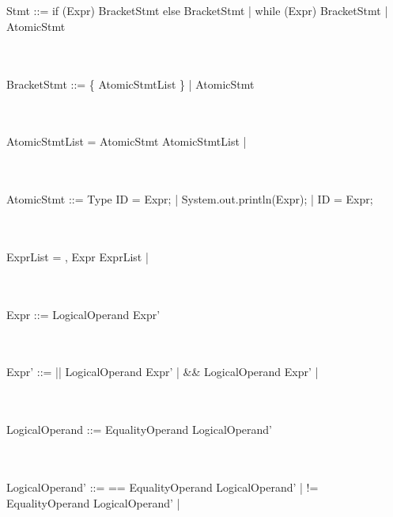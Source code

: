 \documentclass[a4paper,portrait,12pt]{article}
\begin{document}
\\~\\
Stmt ::=	if (Expr) BracketStmt else BracketStmt	\newline
\hspace*{.625in} | while (Expr) BracketStmt		\newline
\hspace*{.625in} | AtomicStmt

\\~\\
BracketStmt ::=	\{ AtomicStmtList \}			\newline
\hspace*{.625in} | AtomicStmt

\\~\\
AtomicStmtList =	AtomicStmt AtomicStmtList	\newline
\hspace*{.625in} | \epsilon

\\~\\
AtomicStmt ::= Type ID = Expr;					\newline
\hspace*{.625in} | System.out.println(Expr);	\newline
\hspace*{.625in} | ID = Expr;

\\~\\
ExprList =	, Expr ExprList	\newline
\hspace*{.625in} | \epsilon

\\~\\
Expr ::=	LogicalOperand Expr'

\\~\\
Expr' ::=	|| LogicalOperand Expr'				\newline
\hspace*{.625in} | \&\& LogicalOperand Expr'	\newline
\hspace*{.625in} | \epsilon

\\~\\
LogicalOperand ::=	EqualityOperand	LogicalOperand'

\\~\\
LogicalOperand' ::=	== EqualityOperand LogicalOperand'	\newline
\hspace*{.625in} | != EqualityOperand LogicalOperand'	\newline
\hspace*{.625in} | \epsilon
\end{document}
